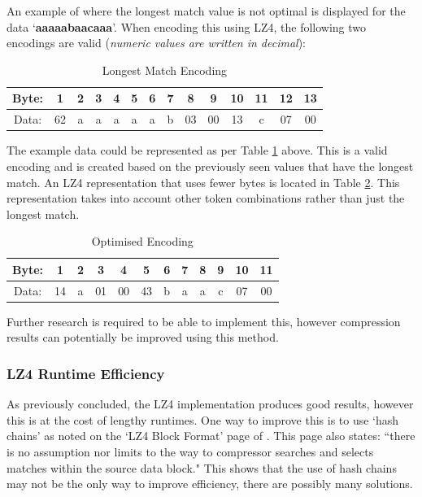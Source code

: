 \documentclass[12pt]{article}
\begin{document}
An example of where the longest match value is not optimal is displayed for the data `\textbf{aaaaabaacaaa}'. When encoding this using LZ4, the following two encodings are valid (\emph{numeric values are written in decimal}):

\begin{table}[H]
	\centering
	\begin{tabular}{| c | c | c | c | c | c | c | c | c | c | c | c | c | c |} 
		\hline
		Byte:&1&2&3&4&5&6&7&8&9&10&11&12&13\\
		\hline
		Data:&62&a&a&a&a&a&b&03&00&13&c&07&00\\
		\hline
	\end{tabular}
	\caption{Longest Match Encoding}
	\label{encoding_1}
\end{table}

The example data could be represented as per Table \ref{encoding_1} above. This is a valid encoding and is created based on the previously seen values that have the longest match. An LZ4 representation that uses fewer bytes is located in Table \ref{encoding_2}. This representation takes into account other token combinations rather than just the longest match.

\begin{table}[H]
	\centering
	\begin{tabular}{| c | c | c | c | c | c | c | c | c | c | c | c |} 
		\hline
		Byte:&1&2&3&4&5&6&7&8&9&10&11\\
		\hline
		Data:&14&a&01&00&43&b&a&a&c&07&00\\
		\hline
	\end{tabular}
\caption{Optimised Encoding}
	\label{encoding_2}
\end{table}

Further research is required to be able to implement this, however compression results can potentially be improved using this method.

\subsubsection{LZ4 Runtime Efficiency}
As previously concluded, the LZ4 implementation produces good results, however this is at the cost of lengthy runtimes. One way to improve this is to use `hash chains' as noted on the `LZ4 Block Format' page of \citep{lz4_github}. This page also states: ``there is no assumption nor limits to the way to compressor searches and selects matches within the source data block." This shows that the use of hash chains may not be the only way to improve efficiency, there are possibly many solutions.
\end{document}
